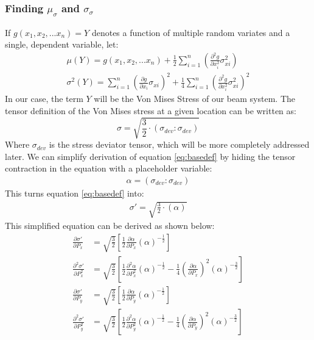 \subsubsection{Finding $\mu_\sigma$ and $\sigma_\sigma$}
If $g(x_1, x_2, ... x_n) = Y$ denotes a function of multiple random variates and a single, dependent variable, let: 
   \begin{align}
	   \mu(Y) = g(x_1, x_2, ... x_n) + \frac{1}{2} \sum_{i=1}^{n}\left( \frac{\partial^2 g}{\partial x_i^2} \sigma_{xi}^2  \right)
	            \label{eq:mu}\\
	   \sigma^2(Y) = \sum_{i=1}^{n}\left( \frac{\partial g}{\partial x_i} \sigma_{xi}  \right)^2 + 
			 \frac{1}{4} \sum_{i=1}^{n}\left( \frac{\partial^2 g}{\partial x_i^2} \sigma_{xi}^2  \right)^2 \label{eq:sigma}
   \end{align}
In our case, the term $Y$ will be the Von Mises Stress of our beam system. The tensor definition of the Von Mises stress at a given location can be written as:
   \begin{equation}
      \sigma = \sqrt{\frac{3}{2} \cdot \left(\sigma_{dev}:\sigma_{dev} \right)}
	\label{eq:basedef}
   \end{equation}
Where $\sigma_{dev}$ is the stress deviator tensor, which will be more completely addressed later. 
We can simplify derivation of equation \ref{eq:basedef} by hiding the tensor contraction in the equation with a placeholder variable:
   \begin{align}
	   \alpha = (\sigma_{dev}:\sigma_{dev})
	   \label{eq:defalpha}
   \end{align}
This turns equation \ref{eq:basedef} into:
   \begin{align}
      \sigma' = \sqrt{\frac{3}{2} \cdot \left(\alpha\right)}
   \end{align}
This simplified equation can be derived as shown below: 
   \begin{align}
	   \frac{\partial \sigma'}{\partial P_x} &= \sqrt{\frac{3}{2}} \left[\frac{1}{2} \frac{\partial \alpha}{\partial P_x} 
						    \left( \alpha \right)^{-\frac{1}{2}}\right]\label{eq:fd_vmx}\\
	   \frac{\partial^2 \sigma'}{\partial P_x^2} &= \sqrt{\frac{3}{2}} \left[ \frac{1}{2}  \frac{\partial ^2 \alpha}{\partial P_x^2}
	                                                \left( \alpha \right)^{-\frac{1}{2}} - 
							\frac{1}{4}  
							\left(\frac{\partial \alpha}{\partial P_x}\right)^2
							\left( \alpha \right)^{-\frac{3}{2}}\right] \\
	   \frac{\partial \sigma'}{\partial P_y} &= \sqrt{\frac{3}{2}} \left[\frac{1}{2} \frac{\partial \alpha}{\partial P_y} 
						    \left( \alpha \right)^{-\frac{1}{2}}\right]\\
	   \frac{\partial^2 \sigma'}{\partial P_y^2} &= \sqrt{\frac{3}{2}} \left[ \frac{1}{2}  \frac{\partial ^2 \alpha}{\partial P_y^2}
	                                                \left( \alpha \right)^{-\frac{1}{2}} - 
							\frac{1}{4}   
							\left(\frac{\partial \alpha}{\partial P_y}\right)^2
							\left( \alpha \right)^{-\frac{3}{2}}\right] \label{eq:sd_vmy}
   \end{align}
